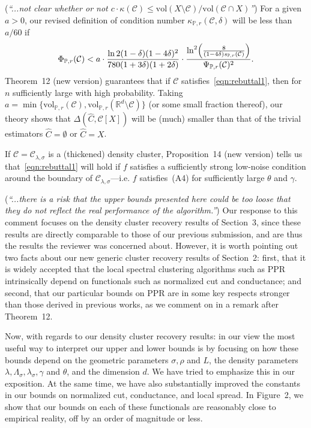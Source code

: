 \documentclass{article}
\newcommand{\Reals}{\mathbb{R}}
\newcommand{\vol}{\mathrm{vol}}
\newcommand{\1}{\mathbf{1}}
\newcommand{\Rd}{\Reals^d}
\newcommand{\mc}[1]{\mathcal{#1}}
\newcommand{\Pbb}{\mathbb{P}}
\newcommand{\wh}[1]{\widehat{#1}}
\theoremstyle{alden}
\theoremstyle{aldenthm}
\theoremstyle{definition}
\theoremstyle{remark}
\begin{document}
(\textit{``...not clear whether or not $c \cdot \kappa(\mc{C}) \leq \vol(X \setminus \mc{C}) / \vol(\mc{C} \cap X)$''}) For a given $a > 0$, our revised definition of condition number $\kappa_{\Pbb,r}(\mc{C},\delta)$ will be less than $a/60$ if
\begin{equation}
\label{eqn:rebuttal1}
\Phi_{\Pbb,r}(\mc{C}) < a \cdot \frac{\ln 2(1 - \delta)(1 - 4\delta)^2}{780(1 + 3\delta)(1 + 2\delta)} \cdot \frac{\ln^2\Bigl(\frac{8}{(1 - 4\delta)s_{\Pbb,r}(\mc{C})}\Bigr)}{\Psi_{\Pbb,r}(\mc{C})^2}.
\end{equation}
Theorem~12 (new version) guarantees that if $\mc{C}$ satisfies~\eqref{eqn:rebuttal1}, then for $n$ sufficiently large \smash{$\Delta(\wh{C},\mc{C}[X])/\vol_{n,r}(\mc{C}[X]) < a$} with high probability. Taking $a = \min\{\vol_{\Pbb,r}(\mc{C}),\vol_{\Pbb,r}(\Rd \setminus \mc{C})\} $ (or some small fraction thereof), our theory shows that $\Delta(\wh{C},\mc{C}[X])$ will be (much) smaller than that of the trivial estimators $\wh{C} = \emptyset$ or $\wh{C} = X$.

If $\mc{C} = \mc{C}_{\lambda,\sigma}$ is a (thickened) density cluster, Proposition~14 (new version) tells us that~\eqref{eqn:rebuttal1} will hold if $f$ satisfies a sufficiently strong low-noise condition around the boundary of $\mc{C}_{\lambda,\sigma}$---i.e. $f$ satisfies~(A4) for sufficiently large $\theta$ and $\gamma$.

(\textit{``...there is a risk that the upper bounds presented here could be too loose that they do not reflect the real performance of the algorithm.''}) Our response to this comment focuses on the density cluster recovery results of Section~3, since these results are directly comparable to those of our previous submission, and are thus the results the reviewer was concerned about. However, it is worth pointing out two facts about our new generic cluster recovery results of Section~2: first, that it is widely accepted that the local spectral clustering algorithms such as PPR intrinsically depend on functionals such as normalized cut and conductance; and second, that our particular bounds on PPR are in some key respects stronger than those derived in previous works, as we comment on in a remark after Theorem~12.

Now, with regards to our density cluster recovery results: in our view the most useful way to interpret our upper and lower bounds is by focusing on how these bounds depend on the geometric parameters $\sigma, \rho$ and $L$, the density parameters $\lambda,\Lambda_{\sigma},\lambda_{\sigma},\gamma$ and $\theta$, and the dimension $d$. We have tried to emphasize this in our exposition. At the same time, we have also substantially improved the constants in our bounds on normalized cut, conductance, and local spread. In Figure~2, we show that our bounds on each of these functionals are reasonably close to empirical reality, off by an order of magnitude or less.
\end{document}
